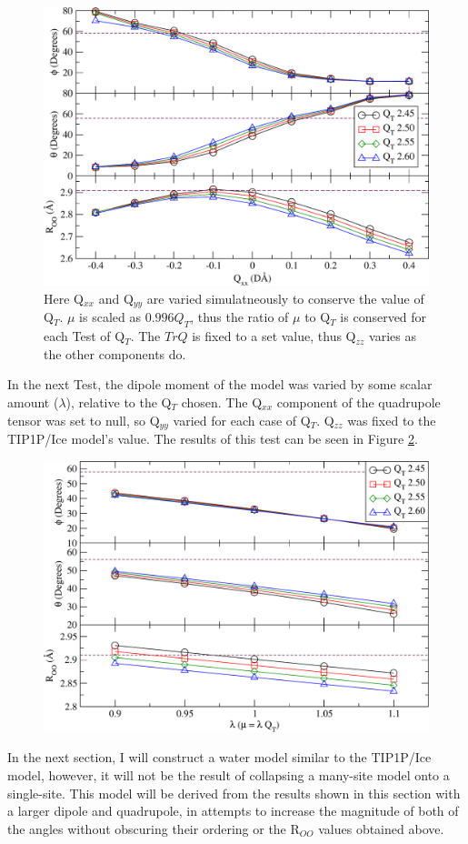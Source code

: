 \begin{figure}[h!]
\includegraphics[width=\linewidth]{Figures/Test12_plot.pdf}
\caption{\label{fig:Q_T}Here Q$_{xx}$ and Q$_{yy}$ are varied simulatneously to conserve the value of Q$_T$. $\mu$ is scaled as $0.996 Q_T$, thus the ratio of $\mu$ to Q$_T$ is conserved for each Test of Q$_T$. The $TrQ$ is fixed to a set value, thus Q$_{zz}$ varies as the other components do. }
\end{figure}


In the next Test, the dipole moment of the model was varied by some scalar
amount ($\lambda$), relative to the Q$_T$ chosen. The Q$_{xx}$ component
of the quadrupole tensor was set to null, so Q$_{yy}$ varied for each 
case of Q$_T$. Q$_{zz}$ was fixed to the TIP1P/Ice model's value. The
results of this test can be seen in Figure \ref{fig:mew}.

\begin{figure}[h!]
\includegraphics[width=\linewidth]{Figures/Test16_plot.pdf}
\caption{\label{fig:mew} }
\end{figure}
In the next section, I will construct a water model similar to the TIP1P/Ice 
model, however, it will not be the result of collapsing a many-site model onto
a single-site. This model will be derived from the results shown in this 
section with a larger dipole and quadrupole, in attempts to increase the 
magnitude of both of the angles without obscuring their ordering or the 
R$_{OO}$ values obtained above.

